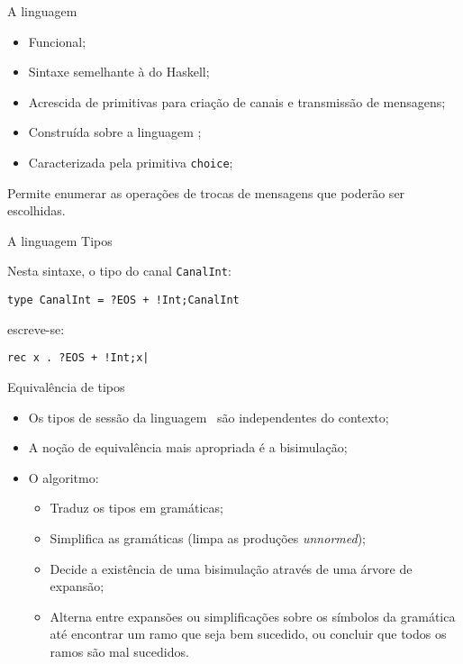 \lstset{language=freest, numbers=none, escapeinside=||}

\begin{frame}[fragile]{A linguagem \mixedchoice}
  \begin{itemize}
  \item Funcional;\pause
  \item Sintaxe semelhante à do Haskell;\pause
  \item Acrescida de primitivas para criação de canais e transmissão de mensagens;\pause
  \item Construída sobre a linguagem \freest;\pause
  \item Caracterizada pela primitiva \lstinline|choice|;\pause
  \end{itemize}

  \begin{tcolorbox}
Permite enumerar as operações de trocas de mensagens que poderão ser escolhidas.
\end{tcolorbox}
\end{frame}

\begin{frame}[fragile]{A linguagem \mixedchoice  \hfill \color{mLightBrown}Tipos}
  
  \pause
  Nesta sintaxe, o tipo do canal \lstinline|CanalInt|:
  \begin{lstlisting}
type CanalInt = ?EOS + !Int;CanalInt
\end{lstlisting}
\pause
escreve-se:
\begin{lstlisting}
rec x . ?EOS + !Int;x|
\end{lstlisting}
\end{frame}

\begin{frame}[fragile]{Equivalência de tipos}
  \begin{itemize}
  \item Os tipos de sessão da linguagem \mixedchoice$\,$ são independentes do contexto;
    \pause
  \item A noção de equivalência mais apropriada é a bisimulação;
    \pause
  \item O algoritmo:
    \begin{itemize}
    \item Traduz os tipos em gramáticas;
      \pause
    \item Simplifica as gramáticas (limpa as produções \textit{unnormed});
      \pause
    \item Decide a existência de uma bisimulação através de uma árvore de expansão;
      \pause
    \item Alterna entre expansões ou simplificações sobre os símbolos da gramática
      até encontrar um ramo que seja bem sucedido, ou concluir que todos os ramos são mal sucedidos.
    \end{itemize}
\end{itemize}
\end{frame}

